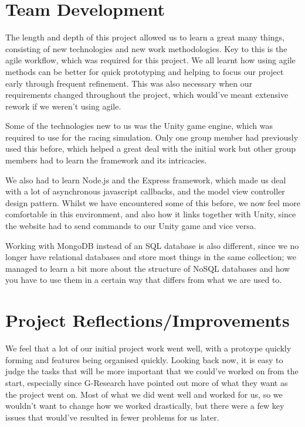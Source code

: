 \section{Team Development}

The length and depth of this project allowed us to learn a great many things,
consisting of new technologies and new work methodologies. Key to this is the
agile workflow, which was required for this project. We all learnt how using
agile methods can be better for quick prototyping and helping to focus our
project early through frequent refinement. This was also necessary when our
requirements changed throughout the project, which would've meant extensive
rework if we weren't using agile.

Some of the technologies new to us was the Unity game engine, which was required
to use for the racing simulation. Only one group member had previously used this
before, which helped a great deal with the initial work but other group members
had to learn the framework and its intricacies. 

We also had to learn Node.js and the Express framework, which made us deal with
a lot of asynchronous javascript callbacks, and the model view controller design
pattern. Whilst we have encountered some of this before, we now feel more
comfortable in this environment, and also how it links together with Unity,
since the website had to send commands to our Unity game and vice versa.

Working with MongoDB instead of an SQL database is also different, since we no
longer have relational databases and store most things in the same collection;
we managed to learn a bit more about the structure of NoSQL databases and how you
have to use them in a certain way that differs from what we are used to.

\section{Project Reflections/Improvements}

We feel that a lot of our initial project work went well, with a protoype
quickly forming and features being organised quickly. Looking back now, it is
easy to judge the tasks that will be more important that we could've worked on
from the start, especially since G-Research have pointed out more of what they
want as the project went on. Most of what we did went well and worked for us, so
we wouldn't want to change how we worked drastically, but there were a few key
issues that would've resulted in fewer problems for us later.

